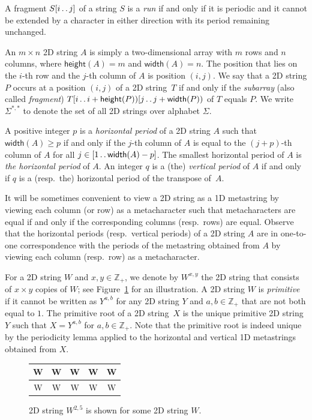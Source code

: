 \documentclass[11pt,letterpaper]{article}
\newcommand{\width}{\textsf{width}}
\newcommand{\height}{\textsf{height}}
\def\dd{\mathinner{.\,.}}
\begin{document}
A fragment $S[i \dd j]$ of a string $S$ is a \emph{run} if and only if it is periodic and it cannot be extended by a character in either direction with its period remaining unchanged.

An $m \times n$ 2D string $A$ is simply a two-dimensional array with $m$ rows and $n$ columns, where $\height(A)=m$ and $\width(A)=n$.
The position that lies on the $i$-th row and the $j$-th column of $A$ is position $(i,j)$. 
We say that a 2D string $P$ occurs at a position $(i,j)$ of a 2D string~$T$ if and only if the \emph{subarray} (also called \emph{fragment}) $T[i \dd i+\height(P))[j \dd j+\width(P))$ of $T$ equals $P$.
We write $\Sigma^{*,*}$ to denote the set of all 2D strings over alphabet $\Sigma$.

A positive integer $p$ is a \emph{horizontal period} of a 2D string $A$ such that $\width(A) \geq p$ if and only if the $j$-th column of $A$ is equal to the $(j+p)$-th column of $A$ for all $j \in [1 \dd \width(A)-p]$.
The smallest horizontal period of $A$ is \emph{the horizontal period} of $A$.
An integer $q$ is a (the) \emph{vertical period} of $A$ if and only if $q$ is a (resp.~the) horizontal period of the transpose of~$A$.

It will be sometimes convenient to view a 2D string as a 1D metastring by viewing each column (or row) as a metacharacter such that metacharacters are equal if and only if the corresponding columns (resp.~rows) are equal. Observe that the horizontal periods (resp.~vertical periods) of a 2D string $A$ are in one-to-one correspondence with the periods of the metastring obtained from $A$ by viewing each column (resp.~row) as a metacharacter.

For a 2D string $W$ and $x, y \in \mathbb{Z}_+$, we denote by $W^{x,y}$ the 2D string that consists of $x\times y$ copies of $W$; see Figure~\ref{fig:2x5w} for an illustration.
A 2D string $W$ is \emph{primitive} if it cannot be written as $Y^{a,b}$ for any 2D string $Y$ and $a,b \in \mathbb{Z}_+$ that are not both equal to $1$.
The primitive root of a 2D string~$X$ is the unique primitive 2D string $Y$ such that $X=Y^{a,b}$ for $a,b \in \mathbb{Z}_+$.
Note that the primitive root is indeed unique by the periodicity lemma applied to the horizontal and vertical 1D metastrings obtained from $X$.

\begin{figure}[t]
\centering
\begin{tabular}{|c|c|c|c|c|}
    \hline
   W & W &W & W&W\\
   \hline
   W & W &W & W&W\\
    \hline
\end{tabular}
\caption{2D string $W^{2,5}$ is shown for some 2D string $W$.}\label{fig:2x5w}
\end{figure}
\end{document}
